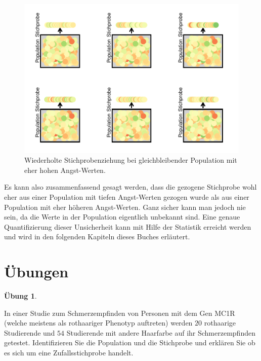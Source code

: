 \documentclass[
]{book}
\theoremstyle{definition}
\theoremstyle{definition}
\theoremstyle{definition}
\newtheorem{exercise}{Übung}[chapter]
\theoremstyle{definition}
\theoremstyle{remark}
\begin{document}
\begin{figure}

{\centering \includegraphics{aps_statistik1_files/figure-latex/srs-intervall-low-p-many-1} 

}

\caption{Wiederholte Stichprobenziehung bei gleichbleibender Population mit eher hohen Angst-Werten.}\label{fig:srs-intervall-low-p-many}
\end{figure}

Es kann also zusammenfassend gesagt werden, dass die gezogene Stichprobe wohl eher aus einer Population mit tiefen Angst-Werten gezogen wurde als aus einer Population mit eher höheren Angst-Werten. Ganz sicher kann man jedoch nie sein, da die Werte in der Population eigentlich unbekannt sind. Eine genaue Quantifizierung dieser Unsicherheit kann mit Hilfe der Statistik erreicht werden und wird in den folgenden Kapiteln dieses Buches erläutert.

\section{Übungen}\label{uxfcbungen}

\begin{exercise}
\protect\hypertarget{exr:redhair}{}\label{exr:redhair}\leavevmode

In einer Studie zum Schmerzempfinden von Personen mit dem Gen MC1R (welche meistens als rothaariger Phenotyp auftreten) werden \(20\) rothaarige Studierende und \(54\) Studierende mit andere Haarfarbe auf ihr Schmerzempfinden getestet. Identifizieren Sie die Population und die Stichprobe und erklären Sie ob es sich um eine Zufallsstichprobe handelt.

\end{exercise}
\end{document}
